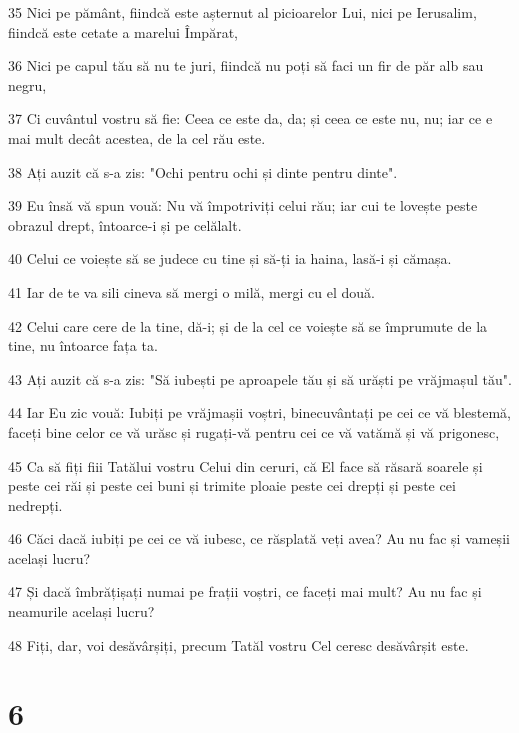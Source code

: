 \par 35 Nici pe pământ, fiindcă este așternut al picioarelor Lui, nici pe Ierusalim, fiindcă este cetate a marelui Împărat,
\par 36 Nici pe capul tău să nu te juri, fiindcă nu poți să faci un fir de păr alb sau negru,
\par 37 Ci cuvântul vostru să fie: Ceea ce este da, da; și ceea ce este nu, nu; iar ce e mai mult decât acestea, de la cel rău este.
\par 38 Ați auzit că s-a zis: "Ochi pentru ochi și dinte pentru dinte".
\par 39 Eu însă vă spun vouă: Nu vă împotriviți celui rău; iar cui te lovește peste obrazul drept, întoarce-i și pe celălalt.
\par 40 Celui ce voiește să se judece cu tine și să-ți ia haina, lasă-i și cămașa.
\par 41 Iar de te va sili cineva să mergi o milă, mergi cu el două.
\par 42 Celui care cere de la tine, dă-i; și de la cel ce voiește să se împrumute de la tine, nu întoarce fața ta.
\par 43 Ați auzit că s-a zis: "Să iubești pe aproapele tău și să urăști pe vrăjmașul tău".
\par 44 Iar Eu zic vouă: Iubiți pe vrăjmașii voștri, binecuvântați pe cei ce vă blestemă, faceți bine celor ce vă urăsc și rugați-vă pentru cei ce vă vatămă și vă prigonesc,
\par 45 Ca să fiți fiii Tatălui vostru Celui din ceruri, că El face să răsară soarele și peste cei răi și peste cei buni și trimite ploaie peste cei drepți și peste cei nedrepți.
\par 46 Căci dacă iubiți pe cei ce vă iubesc, ce răsplată veți avea? Au nu fac și vameșii același lucru?
\par 47 Și dacă îmbrățișați numai pe frații voștri, ce faceți mai mult? Au nu fac și neamurile același lucru?
\par 48 Fiți, dar, voi desăvârșiți, precum Tatăl vostru Cel ceresc desăvârșit este.

\chapter{6}

